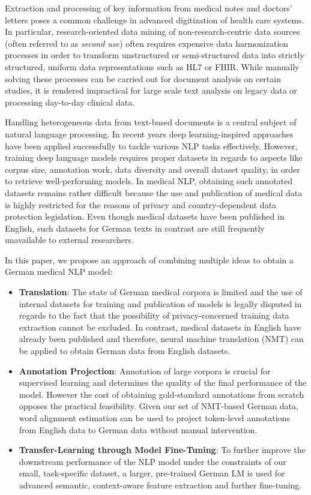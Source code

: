 \documentclass[runningheads]{llncs}
\begin{document}
Extraction and processing of key information from medical notes and doctors' letters poses a common challenge in advanced digitization of health care systems. In particular, research-oriented data mining of non-research-centric data sources (often referred to as \textit{second use}) often requires expensive data harmonization processes in order to transform unstructured or semi-structured data into strictly structured, uniform data representations such as HL7 or FHIR. While manually solving these processes can be carried out for document analysis on certain studies, it is rendered impractical for large scale text analysis on legacy data or processing day-to-day clinical data.

Handling heterogeneous data from text-based documents is a central subject of natural language processing. In recent years deep learning-inspired approaches have been applied successfully to tackle various NLP tasks effectively. However, training deep language models requires proper datasets in regards to aspects like corpus size, annotation work, data diversity and overall dataset quality, in order to retrieve well-performing models. In medical NLP, obtaining such annotated datasets remains rather difficult because the use and publication of medical data is highly restricted for the reasons of privacy and country-dependent data protection legislation. Even though medical datasets have been published in English, such datasets for German texts in contrast are still frequently unavailable to external researchers.

In this paper, we propose an approach of combining multiple ideas to obtain a German medical NLP model:
\begin{itemize}
    \item \textbf{Translation}: The state of German medical corpora is limited and the use of internal datasets for training and publication of models is legally disputed in regards to the fact that the possibility of privacy-concerned training data extraction cannot be excluded. In contrast, medical datasets in English have already been published and therefore, neural machine translation (NMT) can be applied to obtain German data from English datasets. 
    \item \textbf{Annotation Projection}: Annotation of large corpora is crucial for supervised learning and determines the quality of the final performance of the model. However the cost of obtaining gold-standard annotations from scratch opposes the practical feasibility. Given our set of NMT-based German data, word alignment estimation can be used to project token-level annotations from English data to German data without manual intervention.
    \item \textbf{Transfer-Learning through Model Fine-Tuning}: To further improve the downstream performance of the NLP model under the constraints of our small, task-specific dataset, a larger, pre-trained German LM is used for advanced semantic, context-aware feature extraction and further fine-tuning.
\end{itemize}
\end{document}
